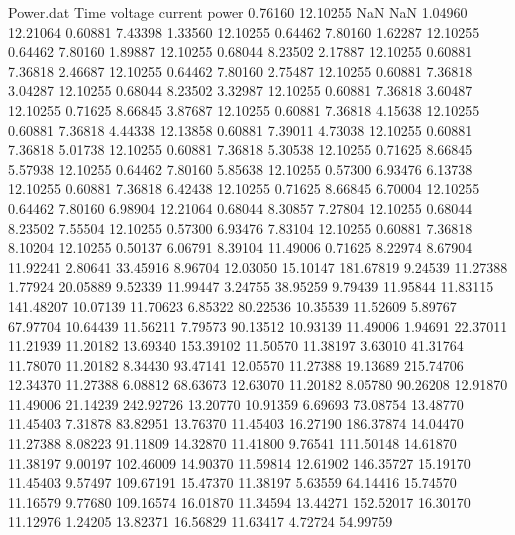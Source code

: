 \begin{filecontents}{Power.dat}
Time voltage current power
   0.76160   12.10255        NaN        NaN
   1.04960   12.21064    0.60881    7.43398
   1.33560   12.10255    0.64462    7.80160
   1.62287   12.10255    0.64462    7.80160
   1.89887   12.10255    0.68044    8.23502
   2.17887   12.10255    0.60881    7.36818
   2.46687   12.10255    0.64462    7.80160
   2.75487   12.10255    0.60881    7.36818
   3.04287   12.10255    0.68044    8.23502
   3.32987   12.10255    0.60881    7.36818
   3.60487   12.10255    0.71625    8.66845
   3.87687   12.10255    0.60881    7.36818
   4.15638   12.10255    0.60881    7.36818
   4.44338   12.13858    0.60881    7.39011
   4.73038   12.10255    0.60881    7.36818
   5.01738   12.10255    0.60881    7.36818
   5.30538   12.10255    0.71625    8.66845
   5.57938   12.10255    0.64462    7.80160
   5.85638   12.10255    0.57300    6.93476
   6.13738   12.10255    0.60881    7.36818
   6.42438   12.10255    0.71625    8.66845
   6.70004   12.10255    0.64462    7.80160
   6.98904   12.21064    0.68044    8.30857
   7.27804   12.10255    0.68044    8.23502
   7.55504   12.10255    0.57300    6.93476
   7.83104   12.10255    0.60881    7.36818
   8.10204   12.10255    0.50137    6.06791
   8.39104   11.49006    0.71625    8.22974
   8.67904   11.92241    2.80641   33.45916
   8.96704   12.03050   15.10147  181.67819
   9.24539   11.27388    1.77924   20.05889
   9.52339   11.99447    3.24755   38.95259
   9.79439   11.95844   11.83115  141.48207
  10.07139   11.70623    6.85322   80.22536
  10.35539   11.52609    5.89767   67.97704
  10.64439   11.56211    7.79573   90.13512
  10.93139   11.49006    1.94691   22.37011
  11.21939   11.20182   13.69340  153.39102
  11.50570   11.38197    3.63010   41.31764
  11.78070   11.20182    8.34430   93.47141
  12.05570   11.27388   19.13689  215.74706
  12.34370   11.27388    6.08812   68.63673
  12.63070   11.20182    8.05780   90.26208
  12.91870   11.49006   21.14239  242.92726
  13.20770   10.91359    6.69693   73.08754
  13.48770   11.45403    7.31878   83.82951
  13.76370   11.45403   16.27190  186.37874
  14.04470   11.27388    8.08223   91.11809
  14.32870   11.41800    9.76541  111.50148
  14.61870   11.38197    9.00197  102.46009
  14.90370   11.59814   12.61902  146.35727
  15.19170   11.45403    9.57497  109.67191
  15.47370   11.38197    5.63559   64.14416
  15.74570   11.16579    9.77680  109.16574
  16.01870   11.34594   13.44271  152.52017
  16.30170   11.12976    1.24205   13.82371
  16.56829   11.63417    4.72724   54.99759

\end{filecontents}
